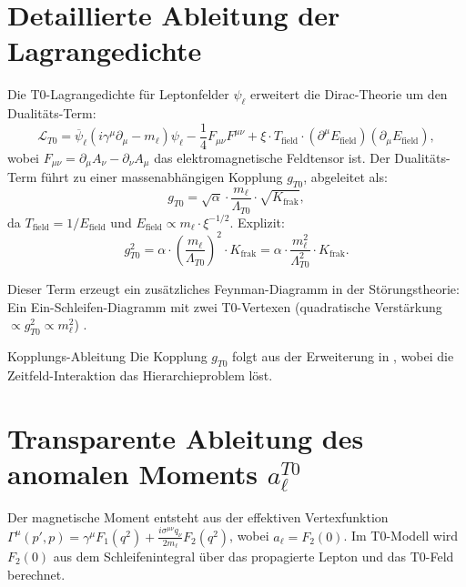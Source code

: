 \documentclass[12pt,a4paper]{article}
\begin{document}
	\section{Detaillierte Ableitung der Lagrangedichte}
	Die T0-Lagrangedichte für Leptonfelder $\psi_\ell$ erweitert die Dirac-Theorie um den Dualitäts-Term:
	\begin{equation}
		\mathcal{L}_{T0} = \overline{\psi}_\ell (i \gamma^\mu \partial_\mu - m_\ell) \psi_\ell - \frac{1}{4} F_{\mu\nu} F^{\mu\nu} + \xi \cdot T_\text{field} \cdot (\partial^\mu E_\text{field}) (\partial_\mu E_\text{field}),
	\end{equation}
	wobei $F_{\mu\nu} = \partial_\mu A_\nu - \partial_\nu A_\mu$ das elektromagnetische Feldtensor ist. Der Dualitäts-Term führt zu einer massenabhängigen Kopplung $g_{T0}$, abgeleitet als:
	\begin{equation}
		g_{T0} = \sqrt{\alpha} \cdot \frac{m_\ell}{\Lambda_{T0}} \cdot \sqrt{K_\text{frak}},
	\end{equation}
	da $T_\text{field} = 1 / E_\text{field}$ und $E_\text{field} \propto m_\ell \cdot \xi^{-1/2}$. Explizit:
	\begin{equation}
		g_{T0}^2 = \alpha \cdot \left( \frac{m_\ell}{\Lambda_{T0}} \right)^2 \cdot K_\text{frak} = \alpha \cdot \frac{m_\ell^2}{\Lambda_{T0}^2} \cdot K_\text{frak}.
	\end{equation}
	
	Dieser Term erzeugt ein zusätzliches Feynman-Diagramm in der Störungstheorie: Ein Ein-Schleifen-Diagramm mit zwei T0-Vertexen (quadratische Verstärkung $\propto g_{T0}^2 \propto m_\ell^2$) \cite{bell_myon}.
	
	\begin{derivation}{Kopplungs-Ableitung}
		Die Kopplung $g_{T0}$ folgt aus der Erweiterung in \cite{QFT_T0}, wobei die Zeitfeld-Interaktion das Hierarchieproblem löst.
	\end{derivation}
	
	\section{Transparente Ableitung des anomalen Moments $a_\ell^{T0}$}
	Der magnetische Moment entsteht aus der effektiven Vertexfunktion $\Gamma^\mu(p',p) = \gamma^\mu F_1(q^2) + \frac{i \sigma^{\mu\nu} q_\nu}{2 m_\ell} F_2(q^2)$, wobei $a_\ell = F_2(0)$. Im T0-Modell wird $F_2(0)$ aus dem Schleifenintegral über das propagierte Lepton und das T0-Feld berechnet.
	
\end{document}
